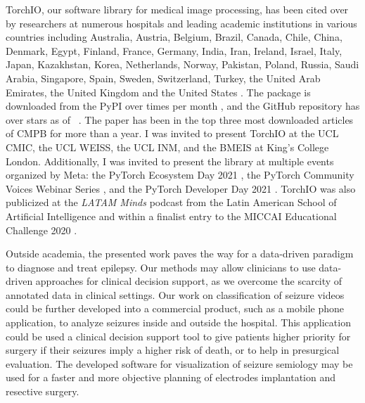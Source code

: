 TorchIO, our software library for medical image processing,
has been cited over \torchiocitations by researchers
at numerous hospitals and leading academic institutions in various countries including
Australia, Austria, Belgium, Brazil, Canada, Chile, China, Denmark, Egypt, Finland, France, Germany, India, Iran, Ireland, Israel, Italy, Japan, Kazakhstan, Korea, Netherlands, Norway, Pakistan, Poland, Russia, Saudi Arabia, Singapore, Spain, Sweden, Switzerland, Turkey, the United Arab Emirates, the United Kingdom and the United States%
.
The package is downloaded from the \ac{PyPI} over \torchiomonthdownloads times per month%
,
and the GitHub repository has over \torchiostars stars%
 as of \monthname~\the\year.
The paper has been in the top three most downloaded articles of \ac{CMPB}%
for more than a year.
I was invited to present TorchIO at
the UCL \ac{CMIC},
the UCL \ac{WEISS},
the UCL \ac{INM}, and
the \ac{BMEIS} at King's College London.
Additionally, I was invited to present the library at multiple events organized by Meta: the PyTorch Ecosystem Day 2021%
,
the PyTorch Community Voices Webinar Series%
,
and the PyTorch Developer Day 2021%
.
TorchIO was also publicized at the \textit{LATAM Minds} podcast from the Latin American School of Artificial Intelligence%
and within a finalist entry to the MICCAI Educational Challenge 2020%
.

Outside academia, the presented work paves the way for a data-driven paradigm to diagnose and treat epilepsy.
Our methods may allow clinicians to use data-driven approaches for clinical decision support, as we overcome the scarcity of annotated data in clinical settings.
Our work on classification of seizure videos could be further developed into a commercial product, such as a mobile phone application, to analyze seizures inside and outside the hospital.
This application could be used a clinical decision support tool to give patients higher priority for surgery if their seizures imply a higher risk of death, or to help in presurgical evaluation.
The developed software for visualization of seizure semiology may be used for a faster and more objective planning of electrodes implantation and resective surgery.


